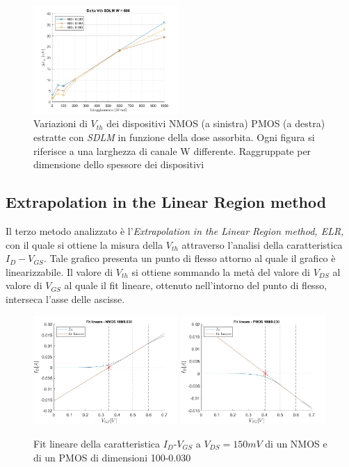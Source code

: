 \documentclass[
	a4paper,
	cleardoublepage=empty,
	headings=twolinechapter,
	numbers=autoenddot,
]{scrbook}
\begin{document}
\begin{figure}[H]
  \includegraphics[width=0.49\textwidth]{sovrapposizione-deltaVth-SDLM-P600}
  \caption{Variazioni di $V_{th}$ dei dispositivi NMOS (a sinistra) PMOS (a destra) estratte con \emph{SDLM} in funzione della dose assorbita. Ogni figura si riferisce a una larghezza di canale W differente. Raggruppate per dimensione dello spessore dei dispositivi}
\end{figure}

\subsection{Extrapolation in the Linear Region method}

Il
terzo metodo analizzato è l'\emph{Extrapolation in the Linear Region method, ELR}, con il quale si ottiene la misura della $V_{th}$ attraverso l'analisi della caratteristica $I_D-V_{GS}$.  Tale grafico presenta un punto di flesso attorno al quale il grafico è linearizzabile. Il valore di $V_{th}$ si ottiene sommando la metà del valore di $V_{DS}$ al valore di $V_{GS}$ al quale il fit lineare, ottenuto nell'intorno del punto di flesso, interseca l'asse delle ascisse.\\


\begin{figure}[h!]
  \centering
  \includegraphics[width=0.49\textwidth]{LinearFit-N4-100-30}
  \includegraphics[width=0.49\textwidth]{LinearFit-P1-100-30}
  \caption{Fit lineare della caratteristica  $I_D$-$V_{GS}$ a $V_{DS}=150mV$ di un NMOS e di un PMOS di dimensioni 100-0.030 }
\end{figure}
\end{document}

